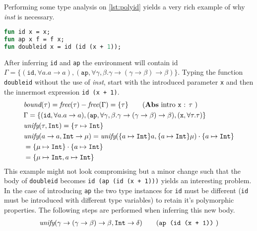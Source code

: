 \documentclass[11pt,oneside,a4paper]{report}
\begin{document}
\begin{exmp}
    Performing some type analysis on \autoref{lst:polyid} yields a very rich example of why \textit{inst} is necessary.
\begin{lstlisting}[language=ML,caption={Polymorphic id},label={lst:polyid},mathescape=true]
fun id x = x;
fun ap x f = f x;
fun doubleid x = id (id (x + 1));
\end{lstlisting}
    After inferring \texttt{id} and \texttt{ap} the environment will contain id $\Gamma = \{ (\texttt{id}, \forall a . a \rightarrow a), (\texttt{ap}, \forall \gamma,\beta . \gamma \rightarrow (\gamma \rightarrow \beta) \rightarrow \beta)\}$.
    Typing the function \texttt{doubleid} without the use of \textit{inst}, start with the introduced parameter \texttt{x} and then the innermost expression \texttt{id (x + 1)}. 
\begin{align}
    &\textit{bound}(\tau) = \textit{free}(\tau) - \textit{free}(\Gamma) = \{ \tau \} \tag{\textbf{Abs} intro \texttt{x} : $\tau$ }\\
    &\Gamma = \{ (\texttt{id}, \forall a . a \rightarrow a), (\texttt{ap}, \forall \gamma,\beta . \gamma \rightarrow (\gamma \rightarrow \beta) \rightarrow \beta), (\texttt{x}, \forall \tau . \tau) \}\\
    &\textit{unify}(\tau, \texttt{Int}) = \{ \tau \mapsto \texttt{Int} \}\\
    &\textit{unify}(a \rightarrow a, \texttt{Int} \rightarrow \mu) = \textit{unify}(\{ a \mapsto \texttt{Int} \}a, \{ a \mapsto \texttt{Int} \}\mu) \cdot \{ a \mapsto \texttt{Int} \}\\
    &= \{ \mu \mapsto \texttt{Int} \} \cdot \{ a \mapsto \texttt{Int} \} \tag*{}\\
    &= \{ \mu \mapsto \texttt{Int}, a \mapsto \texttt{Int} \} \tag*{}
    \label{eq:unifyres}
\end{align}
    This example might not look compromising but a minor change such that the body of \texttt{doubleid} becomes \texttt{id (ap (id (x + 1)))} yields an interesting problem.
    In the case of introducing \texttt{ap} the two type instances for \texttt{id} must be different (\texttt{id} must be introduced with different type variables) to retain it's polymorphic properties.
    The following steps are performed when inferring this new body.
\begin{align}
    &\textit{unify}(\gamma \rightarrow (\gamma \rightarrow \beta) \rightarrow \beta, \texttt{Int} \rightarrow \delta) \tag{\texttt{ap (id (x + 1))} }\\

\end{align}
\end{exmp}
\end{document}

